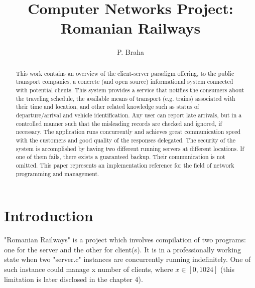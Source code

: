 \documentclass[runningheads]{llncs}
\begin{document}
\title{Computer Networks Project: \\ Romanian Railways}

\author{P. Braha}

\maketitle

\begin{abstract} This work contains an overview of the client-server paradigm offering, to the public transport companies, a concrete (and open source) informational system connected with potential clients. This system provides a service that notifies the consumers about the traveling schedule, the available means of transport (e.g. trains) associated with their time and location, and other related knowledge such as status of departure/arrival and vehicle identification. Any user can report late arrivals, but in a controlled manner such that the misleading records are checked and ignored, if necessary. The application runs concurrently and achieves great communication speed with the customers and good quality of the responses delegated. The security of the system is accomplished by having two different running servers at different locations. If one of them fails, there exists a guaranteed backup. Their communication is not omitted. This paper represents an implementation reference for the field of network programming and management.

\end{abstract}


\section{Introduction}

"Romanian Railways" is a project which involves compilation of two programs: one for the server and the other for client(s). It is in a professionally working state when two "server.c" instances are concurrently running indefinitely. One of such instance could manage x number of clients, where $x \in \left[0, 1024\right]$ (this limitation is later disclosed in the chapter 4). 
\end{document}
